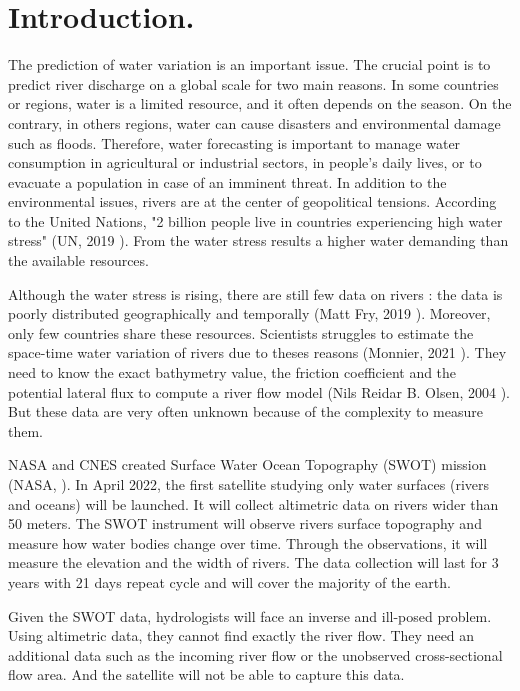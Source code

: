 \section{Introduction.}

The prediction of water variation is an important issue. The crucial point is to predict river discharge on a global scale for two main reasons.  In some countries or regions, water is a limited resource, and it often depends on the season. On the contrary, in others regions, water can cause disasters and environmental damage such as floods. Therefore, water forecasting is important to manage water consumption in agricultural or industrial sectors, in people's daily lives, or to evacuate a population in case of an imminent threat. In addition to the environmental issues, rivers are at the center of geopolitical tensions. According to the United Nations, "2 billion people live in countries experiencing high water stress" (UN, 2019 \cite{ONU}). From the water stress results a higher water demanding than the available resources. 

Although the water stress is rising, there are still few data on rivers : the data is poorly distributed geographically and temporally (Matt Fry, 2019 \cite{insitudata}). Moreover, only few countries share these resources. Scientists struggles to estimate the space-time water variation of rivers due to theses reasons (Monnier, 2021 \cite{conf_monnier}). They need to know the exact bathymetry value, the friction coefficient and the potential lateral flux to compute a river flow model (Nils Reidar B. Olsen, 2004 \cite{courshydro}). But these data are very often unknown because of the complexity to measure them.

NASA and CNES created Surface Water Ocean Topography (SWOT) mission (NASA, \cite{NASA}). In April 2022, the first satellite studying only water surfaces (rivers and oceans) will be launched. It will collect altimetric data on rivers wider than 50 meters. The SWOT instrument will observe rivers surface topography and measure how water bodies change over time. Through the observations, it will measure the elevation and the width of rivers. The data collection will last for 3 years with 21 days repeat cycle and will cover the majority of the earth.

Given the SWOT data, hydrologists will face an inverse and ill-posed problem. Using altimetric data, they cannot find exactly the river flow. They need an additional data such as the incoming river flow or the unobserved cross-sectional flow area. And the satellite will not be able to capture this data.\newline

